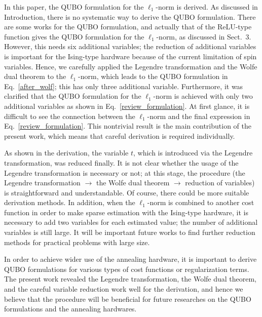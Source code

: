 \documentclass[fp,twocolumn]{jpsj3}
\begin{document}
In this paper, the QUBO formulation for the $\ell_{1}$-norm is derived.
As discussed in Introduction, there is no systematic way to derive the QUBO formulation.
There are some works for the QUBO formulation, and actually that of the ReLU-type function gives the QUBO formulation for the $\ell_{1}$-norm, as discussed in Sect.~3.
However, this needs six additional variables; the reduction of additional variables is important for the Ising-type hardware because of the current limitation of spin variables.
Hence, we carefully applied the Legendre transformation and the Wolfe dual theorem to the $\ell_{1}$-norm, which leads to the QUBO formulation in Eq.~\eqref{after_wolf}; this has only three additional variable.
Furthermore, it was clarified that the QUBO formulation for the $\ell_{1}$-norm is achieved with only two additional variables as shown in Eq.~\eqref{review_formulation}.
At first glance, it is difficult to see the connection between the $\ell_{1}$-norm and the final expression in Eq.~\eqref{review_formulation}.
This nontrivial result is the main contribution of the present work, which means that careful derivation is required individually.

As shown in the derivation, the variable $t$, which is introduced via the Legendre transformation, was reduced finally. It is not clear whether the usage of the Legendre transformation is necessary or not; at this stage, the procedure (the Legendre transformation $\to$ the Wolfe dual theorem $\to$ reduction of variables) is straightforward and understandable.
Of course, there could be more suitable derivation methods.
In addition, when the $\ell_{1}$-norm is combined to another cost function in order to make sparse estimation with the Ising-type hardware, it is necessary to add two variables for each estimated value;
the number of additional variables is still large. 
It will be important future works to find further reduction methods for practical problems with large size.

In order to achieve wider use of the annealing hardware, it is important to derive QUBO formulations for various types of cost functions or regularization terms.
The present work revealed the Legendre transformation, the Wolfe dual theorem, and the careful variable reduction work well for the derivation, and hence we believe that the procedure will be beneficial for future researches on the QUBO formulations and the annealing hardwares.


\begin{acknowledgment}



\end{acknowledgment}
\end{document}

